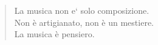 \newpage %


\begin{quote}
La musica non e` solo composizione. \\
Non è artigianato, non è un mestiere. \\
La musica è pensiero. \cite{nono85}
\end{quote}





%

%






